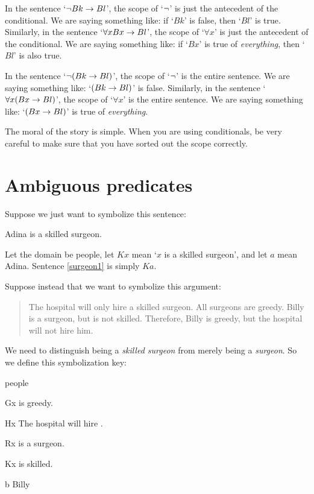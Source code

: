 In the sentence `$\neg Bk \rightarrow Bl$', the scope of `$\neg$' is just the antecedent of the conditional. We are saying something like: if `$Bk$' is false, then `$Bl$' is true. Similarly, in the sentence `$\forall x Bx \rightarrow Bl$', the scope of `$\forall x$' is just the antecedent of the conditional. We are saying something like: if `$Bx$' is true of \emph{everything}, then `$Bl$' is also true. 

In the sentence `$\neg(Bk \rightarrow Bl)$', the scope of `$\neg$' is the entire sentence. We are saying something like: `$(Bk \rightarrow Bl)$' is false. Similarly, in the sentence `$\forall x (Bx \rightarrow Bl)$', the scope of `$\forall x$' is the entire sentence. We are saying something like: `$(Bx \rightarrow Bl)$' is true of \emph{everything}.

The moral of the story is simple. When you are using conditionals, be very careful to make sure that you have sorted out the scope correctly. 


\section{Ambiguous predicates}

Suppose we just want to symbolize this sentence:
\begin{earg}
\item[\ex{surgeon1}] Adina is a skilled surgeon.
\end{earg}
Let the domain be people, let $Kx$ mean `$x$ is a skilled surgeon', and let $a$ mean Adina. Sentence \ref{surgeon1} is simply $Ka$.


Suppose instead that we want to symbolize this argument:
\begin{quote}
The hospital will only hire a skilled surgeon. All surgeons are greedy. Billy is a surgeon, but is not skilled. Therefore, Billy is greedy, but the hospital will not hire him.
\end{quote}
We need to distinguish being a \emph{skilled surgeon} from merely being a \emph{surgeon}. So we define this symbolization key:
\begin{ekey}
\item[\text{domain}] people
\item[Gx]  is greedy.
\item[Hx] The hospital will hire .
\item[Rx]  is a surgeon.
\item[Kx]  is skilled.
\item[b] Billy
\end{ekey}

